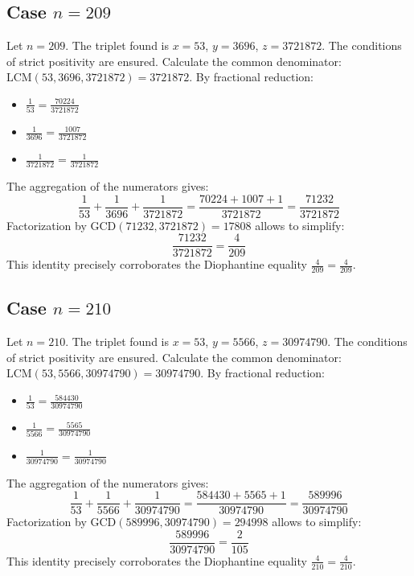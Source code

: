 \documentclass[11pt,a4paper]{article}
\begin{document}
\subsection{Case $n = 209$}
Let $n = 209$. The triplet found is $x = 53$, $y = 3696$, $z = 3721872$.
The conditions of strict positivity are ensured.
Calculate the common denominator: $\text{LCM}(53, 3696, 3721872) = 3721872$.
By fractional reduction:
\begin{itemize}
    \item $\frac{1}{53} = \frac{70224}{3721872}$
    \item $\frac{1}{3696} = \frac{1007}{3721872}$
    \item $\frac{1}{3721872} = \frac{1}{3721872}$
\end{itemize}
The aggregation of the numerators gives:
$$ \frac{1}{53} + \frac{1}{3696} + \frac{1}{3721872} = \frac{70224 + 1007 + 1}{3721872} = \frac{71232}{3721872} $$
Factorization by $\text{GCD}(71232, 3721872) = 17808$ allows to simplify:
$$ \frac{71232}{3721872} = \frac{4}{209} $$
This identity precisely corroborates the Diophantine equality $\frac{4}{209} = \frac{4}{209}$.

\subsection{Case $n = 210$}
Let $n = 210$. The triplet found is $x = 53$, $y = 5566$, $z = 30974790$.
The conditions of strict positivity are ensured.
Calculate the common denominator: $\text{LCM}(53, 5566, 30974790) = 30974790$.
By fractional reduction:
\begin{itemize}
    \item $\frac{1}{53} = \frac{584430}{30974790}$
    \item $\frac{1}{5566} = \frac{5565}{30974790}$
    \item $\frac{1}{30974790} = \frac{1}{30974790}$
\end{itemize}
The aggregation of the numerators gives:
$$ \frac{1}{53} + \frac{1}{5566} + \frac{1}{30974790} = \frac{584430 + 5565 + 1}{30974790} = \frac{589996}{30974790} $$
Factorization by $\text{GCD}(589996, 30974790) = 294998$ allows to simplify:
$$ \frac{589996}{30974790} = \frac{2}{105} $$
This identity precisely corroborates the Diophantine equality $\frac{4}{210} = \frac{4}{210}$.
\end{document}
